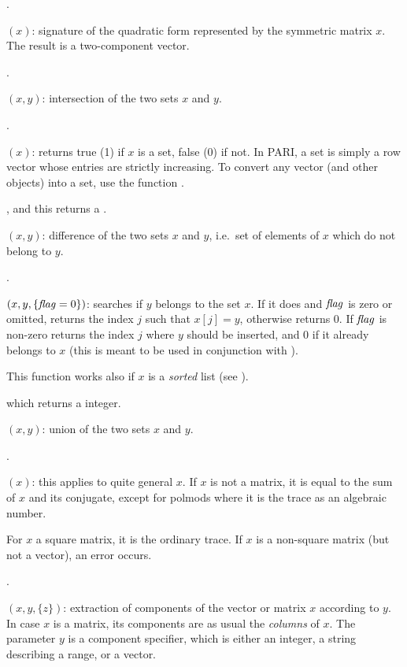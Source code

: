 .

$(x)$: signature of the quadratic form represented by the
symmetric matrix $x$. The result is a two-component vector.

.

$(x,y)$: intersection of the two sets $x$ and $y$.

.

$(x)$: returns true (1) if $x$ is a set, false (0) if
not. In PARI, a set is simply a row vector whose entries are strictly
increasing. To convert any vector (and other objects) into a set, use the
function .

, and this returns a .

$(x,y)$: difference of the two sets $x$ and $y$,
i.e.~set of elements of $x$ which do not belong to $y$.

.

$(x,y,\{\hbox{\it f\kern0pt lag\/}=0\})$: searches if $y$ belongs to the set
$x$. If it does and $\hbox{\it f\kern0pt lag\/}$ is zero or omitted, returns the index $j$ such that
$x[j]=y$, otherwise returns 0. If $\hbox{\it f\kern0pt lag\/}$ is non-zero returns the index $j$
where $y$ should be inserted, and $0$ if it already belongs to $x$ (this is
meant to be used in conjunction with ).

This function works also if $x$ is a \emph{sorted} list (see ).

 which returns a 
integer.

$(x,y)$: union of the two sets $x$ and $y$.

.

$(x)$: this applies to quite general $x$. If $x$ is not a
matrix, it is equal to the sum of $x$ and its conjugate, except for polmods
where it is the trace as an algebraic number.

For $x$ a square matrix, it is the ordinary trace. If $x$ is a
non-square matrix (but not a vector), an error occurs.

.

$(x,y,\{z\})$: extraction of components of the
vector or matrix $x$ according to $y$. In case $x$ is a matrix, its
components are as usual the \emph{columns} of $x$. The parameter $y$ is a
component specifier, which is either an integer, a string describing a
range, or a vector.

